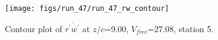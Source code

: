 \begin{figure}[H]
\centering
\texttt{[image: figs/run\_47/run\_47\_rw\_contour]}
\caption{Contour plot of $\overline{r^\prime w^\prime}$ at $z/c$=9.00, $V_{free}$=27.08, station 5.}
\end{figure}


